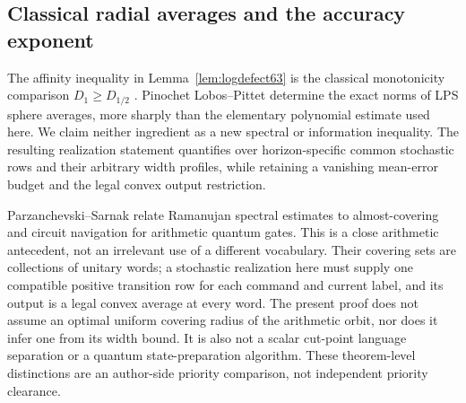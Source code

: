 \subsection{Classical radial averages and the accuracy exponent}
The affinity inequality in Lemma~\ref{lem:logdefect63} is the
classical monotonicity comparison $D_1\ge D_{1/2}$
\cite[Theorem~3]{vEH63}. Pinochet Lobos--Pittet
\cite[Theorem~1.2]{PLP61pre} determine the exact norms of LPS sphere
averages, more sharply than the elementary polynomial estimate used
here. We claim neither ingredient as a new spectral or information
inequality. The resulting realization statement quantifies over
horizon-specific common stochastic rows and their arbitrary width
profiles, while retaining a vanishing mean-error budget and the legal
convex output restriction.

Parzanchevski--Sarnak \cite[Section~3, Proposition~3.1]{PS63} relate
Ramanujan spectral estimates to almost-covering and circuit navigation
for arithmetic quantum gates. This is a close arithmetic antecedent,
not an irrelevant use of a different vocabulary. Their covering sets
are collections of unitary words; a stochastic realization here must
supply one compatible positive transition row for each command and
current label, and its output is a legal convex average at every word.
The present proof does not assume an optimal uniform covering radius
of the arithmetic orbit, nor does it infer one from its width bound.
It is also not a scalar cut-point language separation or a quantum
state-preparation algorithm. These theorem-level distinctions are an
author-side priority comparison, not independent priority clearance.
